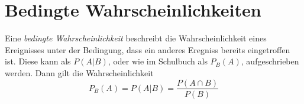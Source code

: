 \documentclass{article}
\begin{document}
 
\section{Bedingte Wahrscheinlichkeiten}
Eine \emph{bedingte Wahrscheinlichkeit} beschreibt die Wahrscheinlichkeit eines Ereignisses unter der Bedingung, dass ein anderes Eregniss bereits eingetroffen ist. Diese kann als $P(A|B)$, oder wie im Schulbuch als $P_B(A)$, aufgeschrieben werden. Dann gilt die Wahrscheinlichkeit 
\[ 
 P_B(A) = P(A|B) = \frac{P(A \cap B)}{P(B)}
\] 
\end{document}

